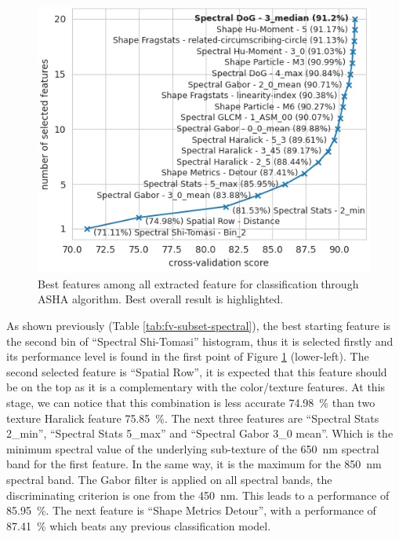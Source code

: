 \documentclass[../thesis.tex]{subfiles}
\begin{document}
    \begin{figure}[H]
        \centering
        \includegraphics[]{img/features/performances-plot-small.jpg}
        \caption{Best features among all extracted feature for classification through ASHA algorithm. Best overall result is highlighted.}
        \label{fig:fv-subset-full}
    \end{figure}
    
    As shown previously (Table \ref{tab:fv-subset-spectral}), the best starting feature is the second bin of ``Spectral Shi-Tomasi'' histogram, thus it is selected firstly and its performance level is found in the first point of Figure \ref{fig:fv-subset-full} (lower-left). The second selected feature is ``Spatial Row'', it is expected that this feature should be on the top as it is a complementary with the color/texture features. At this stage, we can notice that this combination is less accurate \SI{74.98}{\percent} than two texture Haralick feature \SI{75.85}{\percent}.
    The next three features are ``Spectral Stats 2\_min'', ``Spectral Stats 5\_max'' and ``Spectral Gabor 3\_0 mean''. Which is the minimum spectral value of the underlying sub-texture of the \SI{650}{nm} spectral band for the first feature. In the same way, it is the maximum for the \SI{850}{nm} spectral band. The Gabor filter is applied on all spectral bands, the discriminating criterion is one from the \SI{450}{nm}. This leads to a performance of \SI{85.95}{\percent}. The next feature is ``Shape Metrics Detour'', with a performance of \SI{87.41}{\percent} which beats any previous classification model.
    
\end{document}
